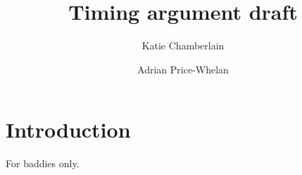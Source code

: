 \documentclass{aastex631}
\begin{document}
\title{Timing argument draft}

\author[0000-0001-8765-8670]{Katie Chamberlain}

\author{Adrian Price-Whelan}
\affiliation{}

\begin{abstract}



\end{abstract}

\section{Introduction} \label{sec:intro}


\appendix
For baddies only.

{}

\end{document}
